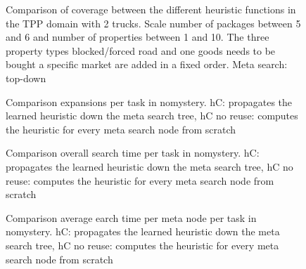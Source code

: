 \begin{figure}[ht]
\caption{Comparison of coverage between the different heuristic functions in the TPP domain with 2 trucks. Scale number of packages between 5 and 6 and number of 
	properties between 1 and 10. The three property types blocked/forced road and one goods needs to be bought a 
	specific market are added in a fixed order.  Meta search: top-down}
\end{figure}


\newpage
\begin{figure}[ht]
\small


\caption{Comparison expansions per task in nomystery. hC: propagates the learned heuristic down the meta search tree, hC no reuse: computes the heuristic for every meta search node from scratch}
\end{figure}
\begin{figure}[ht]
\small


\caption{Comparison overall search time per task in nomystery. hC: propagates the learned heuristic down the meta search tree, hC no reuse: computes the heuristic for every meta search node from scratch}
\end{figure}

\begin{figure}[ht]
\small


\caption{Comparison average earch time per meta node per task in nomystery. hC: propagates the learned heuristic down the meta search tree, hC no reuse: computes the heuristic for every meta search node from scratch}
\end{figure}

%
%
%
%
